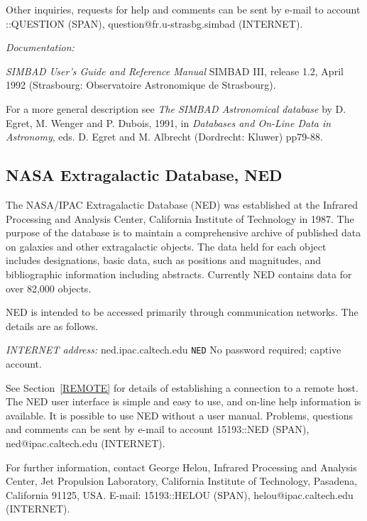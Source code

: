 Other inquiries, requests for help and comments can be sent by e-mail
to account 
::QUESTION (SPAN), question@fr.u-strasbg.simbad
(INTERNET).

{\it Documentation:}

{\it SIMBAD User's Guide and Reference Manual} SIMBAD III, release 1.2,
April 1992 (Strasbourg: Observatoire Astronomique de Strasbourg).

For a more general description see {\it The SIMBAD Astronomical 
database} by D. Egret, M. Wenger and P. Dubois, 1991, in {\it Databases 
and On-Line Data in Astronomy}, eds. D. Egret and M. Albrecht 
(Dordrecht: Kluwer) pp79-88.

\subsection{NASA Extragalactic Database, NED
}

The NASA/IPAC Extragalactic Database (NED) was established at the 
Infrared Processing and Analysis Center, California Institute of 
Technology in 1987. The purpose of the database is to maintain a 
comprehensive archive of published data on galaxies and other 
extragalactic objects. The data held for each object includes 
designations, basic data, such as positions and magnitudes, and 
bibliographic information including abstracts. Currently NED contains
data for over 82,000 objects.

NED is intended to be accessed primarily through communication networks.
The details are as follows.

{\it INTERNET address:} ned.ipac.caltech.edu
 \verb-NED-
 No password required; captive account.

See Section~\ref{REMOTE} for details of establishing a connection to
a remote host. The NED user interface is simple and easy to use,
and on-line help information is available. It is possible to use NED
without a user manual. Problems, questions and comments can be sent by
e-mail to account 15193::NED (SPAN), ned@ipac.caltech.edu (INTERNET).

For further information, contact George Helou, Infrared Processing and
Analysis Center, Jet Propulsion Laboratory, California Institute of
Technology, Pasadena, California 91125, USA. E-mail: 15193::HELOU 
(SPAN), helou@ipac.caltech.edu (INTERNET).

